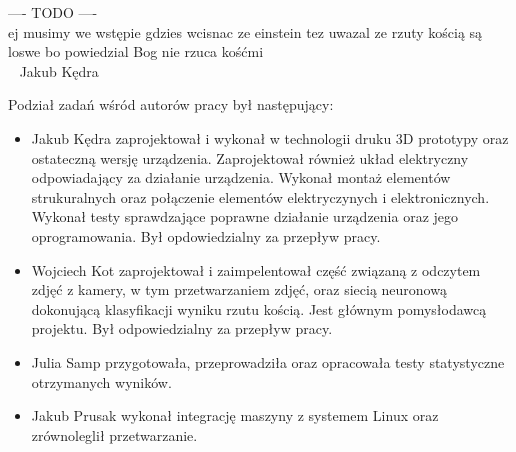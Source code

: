 ---- TODO ---- \\
ej musimy we wstępie gdzies wcisnac ze einstein tez uwazal ze rzuty kością są loswe bo powiedzial Bog nie rzuca kośćmi \\
~ Jakub Kędra



Podział zadań wśród autorów pracy był następujący:
\begin{itemize}
    \item Jakub Kędra zaprojektował i wykonał w technologii druku 3D prototypy oraz ostateczną wersję urządzenia. Zaprojektował również układ elektryczny 
    odpowiadający za działanie urządzenia. Wykonał montaż elementów strukuralnych oraz połączenie elementów elektryczynych i elektronicznych. Wykonał testy sprawdzające poprawne działanie
    urządzenia oraz jego oprogramowania. Był opdowiedzialny za przepływ pracy.
    \item Wojciech Kot zaprojektował i zaimpelentował część związaną z odczytem zdjęć z kamery, w tym przetwarzaniem zdjęć,
    oraz siecią neuronową dokonującą klasyfikacji wyniku rzutu kością. Jest głównym pomysłodawcą projektu. Był odpowiedzialny za przepływ pracy.
    \item Julia Samp przygotowała, przeprowadziła oraz opracowała testy statystyczne otrzymanych wyników. 
    \item Jakub Prusak wykonał integrację maszyny z systemem Linux oraz zrównoleglił przetwarzanie.
\end{itemize}



